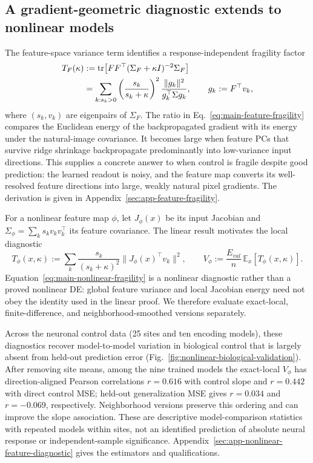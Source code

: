 \documentclass{article}
\theoremstyle{plain}
\theoremstyle{definition}
\theoremstyle{remark}
\begin{document}
\begingroup\color{red}
\subsection{A gradient-geometric diagnostic extends to nonlinear models}
\label{sec:nonlinear-control-diagnostic}

The feature-space variance term identifies a response-independent fragility
factor
\begin{align}
T_F(\kappa)
&:=\operatorname{tr}\!\left[FF^\top(\Sigma_F+\kappa I)^{-2}\Sigma_F\right]\notag\\
&=\sum_{k:s_k>0}\left(\frac{s_k}{s_k+\kappa}\right)^2
\frac{\|g_k\|^2}{g_k^\top\Sigma g_k},
\qquad g_k:=F^\top v_k,
\label{eq:main-feature-fragility}
\end{align}
where $(s_k,v_k)$ are eigenpairs of $\Sigma_F$.  The ratio in
Eq.~\ref{eq:main-feature-fragility} compares the Euclidean energy of the
backpropagated gradient with its energy under the natural-image covariance.
It becomes large when feature PCs that survive ridge shrinkage backpropagate
predominantly into low-variance input directions.  This supplies a concrete
answer to when control is fragile despite good prediction: the learned readout
is noisy, and the feature map converts its well-resolved feature directions
into large, weakly natural pixel gradients.  The derivation is given in
Appendix~\ref{sec:app-feature-fragility}.

For a nonlinear feature map $\phi$, let $J_\phi(x)$ be its input Jacobian and
$\Sigma_\phi=\sum_k s_kv_kv_k^\top$ its feature covariance.  The linear result
motivates the local diagnostic
\begin{equation}
T_\phi(x,\kappa)
:=\sum_k\frac{s_k}{(s_k+\kappa)^2}
\|J_\phi(x)^\top v_k\|^2,
\qquad
V_\phi:=\frac{E_{val}}{n}\,\mathbb E_x[T_\phi(x,\kappa)].
\label{eq:main-nonlinear-fragility}
\end{equation}
Equation~\ref{eq:main-nonlinear-fragility} is a nonlinear diagnostic rather
than a proved nonlinear DE: global feature variance and local Jacobian energy
need not obey the identity used in the linear proof.  We therefore evaluate
exact-local, finite-difference, and neighborhood-smoothed versions separately.

Across the neuronal control data (25 sites and ten encoding models), these
diagnostics recover model-to-model variation in biological control that is
largely absent from held-out prediction error (Fig.~\ref{fig:nonlinear-biological-validation}).
After removing site means, among the nine trained models the exact-local
$V_\phi$ has direction-aligned Pearson correlations $r=0.616$ with control
slope and $r=0.442$ with direct control MSE; held-out generalization MSE gives
$r=0.034$ and $r=-0.069$, respectively.  Neighborhood versions preserve this
ordering and can improve the slope association.  These are descriptive
model-comparison statistics with repeated models within sites, not an
identified prediction of absolute neural response or independent-sample
significance.  Appendix~\ref{sec:app-nonlinear-feature-diagnostic} gives the
estimators and qualifications.
\end{document}
